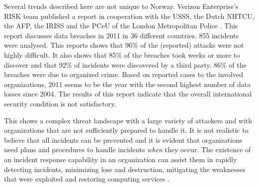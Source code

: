 Several trends described here are not unique to Norway. Verizon Enterprise's RISK team published a report in cooperation with the \ac{USSS}, the Dutch \ac{NHTCU}, the \ac{AFP}, the \ac{IRISS} and the \ac{PCeU} of the London Metropolitan Police \cite{VerizonReport}. This report discusses data breaches in 2011 in 36 different countries. 855 incidents were analysed. This reports shows that 96\% of the (reported) attacks were not highly difficult. It also shows that 85\% of the breaches took weeks or more to discover and that 92\% of incidents were discovered by a third party. 86\% of the breaches were due to organized crime. Based on reported cases to the involved organizations, 2011 seems to be the year with the second highest number of data losses since 2004. The results of this report indicate that the overall international security condition is not satisfactory.

This shows a complex threat landscape with a large variety of attackers and with organizations that are not sufficiently prepared to handle it. It is not realistic to believe that all incidents can be prevented and it is evident that organizations need plans and procedures to handle incidents \textit{when} they occur. The existence of an incident response capability in an organization can assist them in rapidly detecting incidents, minimizing loss and destruction, mitigating the weaknesses that were exploited and restoring computing services \cite{nist800-61}. 